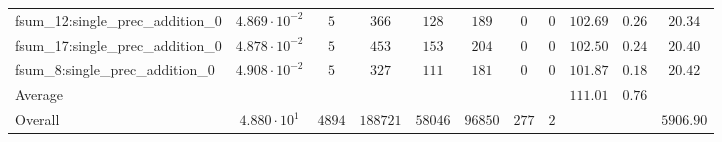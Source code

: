 \begin{tabular}{|l|c|c|c|c|c|c|c|c|c|c|}
fsum\_12:single\_prec\_addition\_0             & $ 4.869 \cdot 10^{-2} $ & $ 5      $ & $ 366    $ & $ 128   $ & $ 189   $ & $ 0   $ & $ 0 $ & $ 102.69      $ & $ 0.26    $ & $ 20.34   $ \\
fsum\_17:single\_prec\_addition\_0             & $ 4.878 \cdot 10^{-2} $ & $ 5      $ & $ 453    $ & $ 153   $ & $ 204   $ & $ 0   $ & $ 0 $ & $ 102.50      $ & $ 0.24    $ & $ 20.40   $ \\
fsum\_8:single\_prec\_addition\_0              & $ 4.908 \cdot 10^{-2} $ & $ 5      $ & $ 327    $ & $ 111   $ & $ 181   $ & $ 0   $ & $ 0 $ & $ 101.87      $ & $ 0.18    $ & $ 20.42   $ \\
\hline
Average                                        & $                     $ & $        $ & $        $ & $       $ & $       $ & $     $ & $   $ & $ 111.01      $ & $ 0.76    $ & $         $ \\
\hline
Overall                                        & $ 4.880 \cdot 10^{1}  $ & $ 4894   $ & $ 188721 $ & $ 58046 $ & $ 96850 $ & $ 277 $ & $ 2 $ & $             $ & $         $ & $ 5906.90 $ \\
\hline
\end{tabular}
